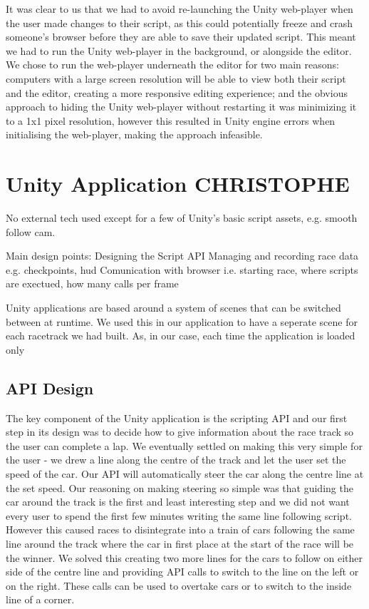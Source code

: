 It was clear to us that we had to avoid re-launching the Unity web-player when the user made changes to their script, as this could potentially freeze and crash someone's browser before they are able to save their updated script. This meant we had to run the Unity web-player in the background, or alongside the editor. We chose to run the web-player underneath the editor for two main reasons: computers with a large screen resolution will be able to view both their script and the editor, creating a more responsive editing experience; and the obvious approach to hiding the Unity web-player without restarting it was minimizing it to a 1x1 pixel resolution, however this resulted in Unity engine errors when initialising the web-player, making the approach infeasible. 

\section{Unity Application {\color{blue} CHRISTOPHE}}
No external tech used except for a few of Unity's basic script assets, e.g. smooth follow cam.

Main design points:
Designing the Script API
Managing and recording race data e.g. checkpoints, hud
Comunication with browser i.e. starting race, where scripts are exectued, how many calls per frame

Unity applications are based around a system of scenes that can be switched between at runtime. We used this in our application to have a seperate scene for each racetrack we had built. As, in our case, each time the application is loaded only

\subsection{API Design}
The key component of the Unity application is the scripting API and our first step in its design was to decide how to give information about the race track so the user can complete a lap. We eventually settled on making this very simple for the user - we drew a line along the centre of the track and let the user set the speed of the car. Our API will automatically steer the car along the centre line at the set speed. Our reasoning on making steering so simple was that guiding the car around the track is the first and least interesting step and we did not want every user to spend the first few minutes writing the same line following script. However this caused races to disintegrate into a train of cars following the same line around the track where the car in first place at the start of the race will be the winner. We solved this creating two more lines for the cars to follow on either side of the centre line and providing API calls to switch to the line on the left or on the right. These calls can be used to overtake cars or to switch to the inside line of a corner.

